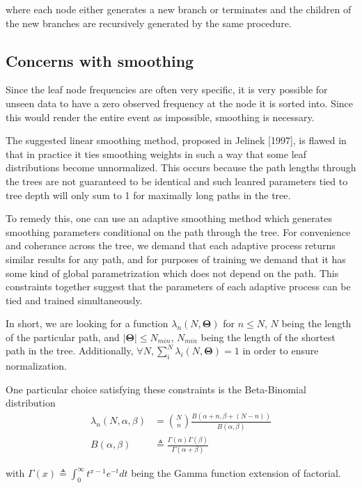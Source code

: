 \documentclass[12pt]{article}
\begin{document}
where each node either generates a new branch or terminates and the
children of the new branches are recursively generated by the same
procedure.

\subsection{Concerns with smoothing}

Since the leaf node frequencies are often very specific, it is very
possible for unseen data to have a zero observed frequency at the node
it is sorted into. Since this would render the entire event as
impossible, smoothing is necessary.

The suggested linear smoothing method, proposed in Jelinek [1997], is
flawed in that in practice it ties smoothing weights in such a way
that some leaf distributions become unnormalized. This occurs because
the path lengths through the trees are not guaranteed to be identical
and such leanred parameters tied to tree depth will only sum to 1 for
maximally long paths in the tree.

To remedy this, one can use an adaptive smoothing method which
generates smoothing parameters conditional on the path through the
tree. For convenience and coherance across the tree, we demand that
each adaptive process returns similar results for any path, and for
purposes of training we demand that it has some kind of global
parametrization which does not depend on the path. This constraints
together suggest that the parameters of each adaptive process can be
tied and trained simultaneously.

In short, we are looking for a function $\lambda_n(N,
\mathbf{\Theta})$ for $n \le N$, $N$ being the length of the
particular path, and $|\mathbf{\Theta}| \le N_{min}$, $N_{min}$ being
the length of the shortest path in the tree. Additionally, $\forall N,
\sum_i^N \lambda_i(N, \mathbf{\Theta}) = 1$ in order to ensure
normalization.

One particular choice satisfying these constraints is the
Beta-Binomial distribution
\begin{align}
  \lambda_n(N, \alpha, \beta) 
  &= {N \choose n} \frac{B(\alpha + n, \beta + (N-n))}{B(\alpha, \beta)} \\
  B(\alpha, \beta) 
  &\triangleq \frac{\Gamma(\alpha)\Gamma(\beta)}{\Gamma(\alpha + \beta)}
\end{align}

with $\Gamma(x) \triangleq \int_0^\infty t^{x-1} e^{-t} dt$ being the
Gamma function extension of factorial. 
\end{document}
